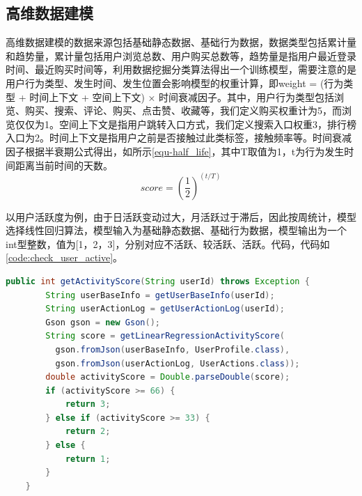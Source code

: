   \subsection{高维数据建模}
  高维数据建模的数据来源包括基础静态数据、基础行为数据，数据类型包括累计量和趋势量，累计量包括用户浏览总数、用户购买总数等，趋势量是指用户最近登录时间、最近购买时间等，利用数据挖掘分类算法得出一个训练模型，需要注意的是用户行为类型、发生时间、发生位置会影响模型的权重计算，即weight = (行为类型 + 时间上下文 + 空间上下文) × 时间衰减因子。其中，用户行为类型包括浏览、购买、搜索、评论、购买、点击赞、收藏等，我们定义购买权重计为5，而浏览仅仅为1。空间上下文是指用户跳转入口方式，我们定义搜索入口权重3，排行榜入口为2。时间上下文是指用户之前是否接触过此类标签，接触频率等。时间衰减因子根据半衰期公式得出，如所示\autoref{equ-half_life}，其中T取值为1，t为行为发生时间距离当前时间的天数。
  \begin{equation}
    score=(\frac{1}{2})^{(t/T)}
    \label{equ-half_life}
  \end{equation}

  以用户活跃度为例，由于日活跃变动过大，月活跃过于滞后，因此按周统计，模型选择线性回归算法，模型输入为基础静态数据、基础行为数据，模型输出为一个int型整数，值为[1，2，3]，分别对应不活跃、较活跃、活跃。代码，代码如\autoref{code:check_user_active}。
  \begin{lstlisting}[language=java,firstnumber=1,label={code:check_user_active}]
    public int getActivityScore(String userId) throws Exception {
        String userBaseInfo = getUserBaseInfo(userId);
        String userActionLog = getUserActionLog(userId);
        Gson gson = new Gson();
        String score = getLinearRegressionActivityScore(
          gson.fromJson(userBaseInfo, UserProfile.class), 
          gson.fromJson(userActionLog, UserActions.class));
        double activityScore = Double.parseDouble(score);
        if (activityScore >= 66) {
            return 3;
        } else if (activityScore >= 33) {
            return 2;
        } else {
            return 1;
        }
    }
  \end{lstlisting}

